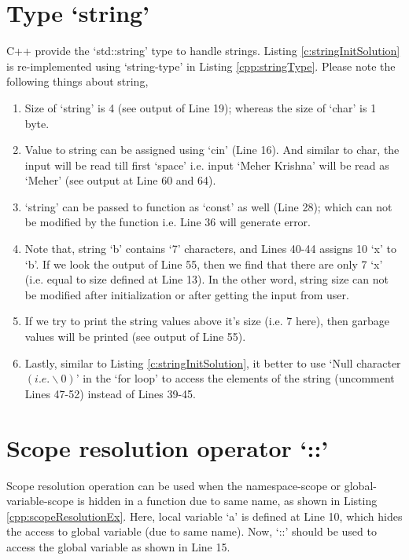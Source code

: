

\section{Type `string'}
C++ provide the `std::string' type to handle strings. Listing \ref{c:stringInitSolution} is re-implemented using `string-type' in Listing \ref{cpp:stringType}. Please note the following things about string, 

\begin{enumerate}
	\item Size of `string' is 4 (see output of Line 19); whereas the size of `char' is 1 byte.
	\item Value to string can be assigned using `cin' (Line 16). And similar to char, the input will be read till first `space' i.e. input `Meher Krishna' will be read as `Meher' (see output at Line 60 and 64). 
	\item `string' can be passed to function as `const' as well (Line 28); which can not be modified by the function i.e. Line 36 will generate error. 
	\item Note that, string `b' contains `7' characters, and Lines 40-44 assigns 10 `x' to `b'. If we look the output of Line 55, then we find that there are only 7 `x' (i.e. equal to size defined at Line 13). In the other word, string size can not be modified after initialization or after getting the input from user. 
	\item If we try to print the string values above it's size (i.e. 7 here), then garbage values will be printed (see output of Line 55). 
	\item Lastly, similar to Listing \ref{c:stringInitSolution},  it better to use `Null character $(i.e. \backslash 0)$' in the `for loop' to access the elements of the string (uncomment Lines 47-52) instead of Lines 39-45. 
\end{enumerate}




\section{Scope resolution operator `::'}
Scope resolution operation can be used when the namespace-scope or global-variable-scope is hidden in a function due to same name, as shown in Listing \ref{cpp:scopeResolutionEx}. Here, local variable `a' is defined at Line 10, which hides the access to global variable (due to same name). Now, `::' should be used to access the global variable as shown in Line 15.  

